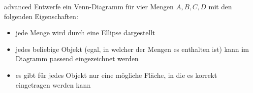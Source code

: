 \documentclass[../abbildungen.tex]{subfiles}
\begin{document}
\begin{exercise}{advanced}
    Entwerfe ein Venn-Diagramm für vier Mengen $A,B,C,D$ mit den folgenden Eigenschaften:
    \begin{itemize}
        \item jede Menge wird durch eine Ellipse dargestellt
        \item jedes beliebige Objekt (egal, in welcher der Mengen es enthalten ist) kann im Diagramm passend eingezeichnet werden
        \item es gibt für jedes Objekt nur eine mögliche Fläche, in die es korrekt eingetragen werden kann
    \end{itemize}
\end{exercise}
\end{document}
